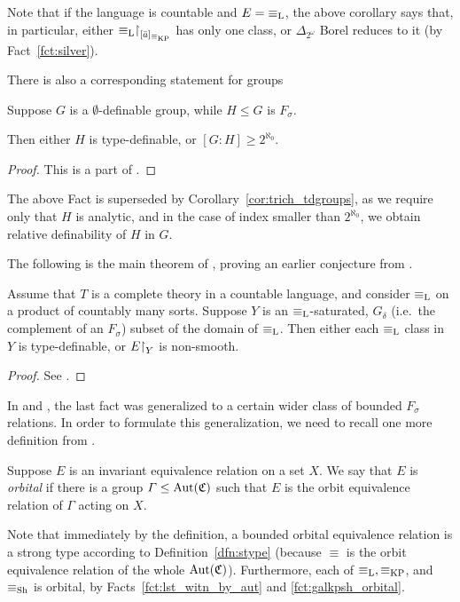 	Note that if the language is countable and $E={\equiv_{\mathrm{L}}}$, the above corollary says that, in particular, either ${\equiv_{\mathrm{L}}}\mathord{\upharpoonright}_{[\bar a]_{\equiv_{\mathrm{KP}}}}$ has only one class, or $\Delta_{2^\omega}$ Borel reduces to it (by Fact~\ref{fct:silver}).
	
	There is also a corresponding statement for groups
	
	\begin{fct}
		\label{fct:new_group}
		Suppose $G$ is a $\emptyset$-definable group, while $H\leq G$ is $F_\sigma$.
		
		Then either $H$ is type-definable, or $[G:H]\geq 2^{\aleph_0}$.
	\end{fct}
	\begin{proof}
		This is a part of \cite[Theorem 3.1]{Ne03}.
	\end{proof}
	The above Fact is superseded by Corollary~\ref{cor:trich_tdgroups}, as we require only that $H$ is analytic, and in the case of index smaller than $2^{\aleph_0}$, we obtain relative definability of $H$ in $G$.
	
	The following is the main theorem of \cite{KMS14}, proving an earlier conjecture from \cite{KPS13}.
	\begin{fct}
		\label{fct:KMS_theorem}
		Assume that $T$ is a complete theory in a countable language, and consider $\equiv_{\mathrm{L}}$ on a product of countably many sorts. Suppose $Y$ is an $\equiv_{\mathrm{L}}$-saturated, $G_\delta$ (i.e.\ the complement of an $F_\sigma$) subset of the domain of $\equiv_{\mathrm{L}}$. Then either each $\equiv_{\mathrm{L}}$ class in $Y$ is type-definable, or $E\mathord{\upharpoonright}_Y$ is non-smooth.
	\end{fct}
	\begin{proof}
		See \cite[Main Theorem A]{KMS14}.
	\end{proof}
	
	In \cite{KM14} and \cite{KR16}, the last fact was generalized to a certain wider class of bounded $F_\sigma$ relations. In order to formulate this generalization, we need to recall one more definition from \cite{KR16}.
	
	\begin{dfn}
		\label{dfn:orbital_stype}
		Suppose $E$ is an invariant equivalence relation on a set $X$. We say that $E$ is \emph{orbital} if there is a group $\Gamma\leq \operatorname{{Aut}}({\mathfrak C})$ such that $E$ is the orbit equivalence relation of $\Gamma$ acting on $X$.\xqed{\lozenge}
	\end{dfn}
	
	\begin{rem}
		Note that immediately by the definition, a bounded orbital equivalence relation is a strong type according to Definition~\ref{dfn:stype} (because $\equiv$ is the orbit equivalence relation of the whole $\operatorname{{Aut}}({\mathfrak C})$). Furthermore, each of $\equiv_{\mathrm{L}},\equiv_{\mathrm{KP}}$, and $\equiv_{\mathrm{Sh}}$ is orbital, by Facts~\ref{fct:lst_witn_by_aut} and \ref{fct:galkpsh_orbital}.\xqed{\lozenge}
	\end{rem}
	
